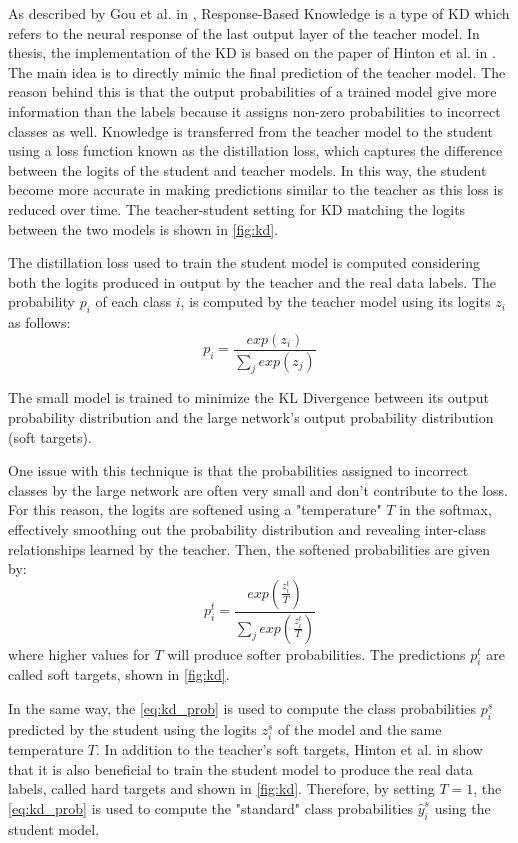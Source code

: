 As described by Gou et al. in \cite{gou2021knowledge},
Response-Based Knowledge is a type of KD which refers to the neural
response of the last output layer of the teacher model.
In thesis, the implementation of the KD is based on the paper of Hinton et al. in \cite{hinton2015distilling}.
The main idea is to directly mimic the final prediction
of the teacher model.
The reason behind this is that the output probabilities of a trained model give more information than the labels because it assigns non-zero probabilities to incorrect classes as well.
Knowledge is transferred from the teacher model to the student using a loss function known as the distillation loss, which captures the difference between the logits of the student and teacher models. In this way, the student become more accurate in making predictions similar to the teacher as this loss is reduced over time. The teacher-student setting for KD matching the logits between the two models is shown in \autoref{fig:kd}.

The distillation loss used to train the student model is computed considering both the logits produced in output by the teacher and the real data labels.
The probability $p_i$ of each class $i$, is computed by the teacher model using its logits $z_i$ as follows:
\begin{equation}
    p_i = \frac{exp(z_i)}{\sum_j exp(z_j)}
\end{equation}

The small model is trained to minimize the KL Divergence between its output probability distribution and the large network's output probability distribution (soft targets).

One issue with this technique is that the probabilities assigned to incorrect classes by the large network are often very small and don't contribute to the loss. For this reason, the logits are softened using a "temperature" $T$ in the softmax, effectively smoothing out the probability distribution and revealing inter-class relationships learned by the teacher. Then, the softened probabilities are given by:
\begin{equation}\label{eq:kd_prob}
    p_i^t = \frac{exp(\frac{z_i^t}{T})}{\sum_j exp(\frac{z_i^t}{T})}
\end{equation}
where higher values for $T$ will produce softer probabilities. The predictions $p_i^t$ are called soft targets, shown in \autoref{fig:kd}.

In the same way, the \autoref{eq:kd_prob} is used to compute the class probabilities $p_i^s$ predicted by the student using the logits $z_i^s$ of the model and the same temperature $T$. In addition to the teacher's soft targets, Hinton et al. in \cite{hinton2015distilling} show that it is also beneficial to train the student model to produce the real data labels, called hard targets and shown in \autoref{fig:kd}.
Therefore, by setting $T = 1$, the \autoref{eq:kd_prob} is used to compute the "standard" class probabilities $\hat{y}_i^s$ using the student model.

